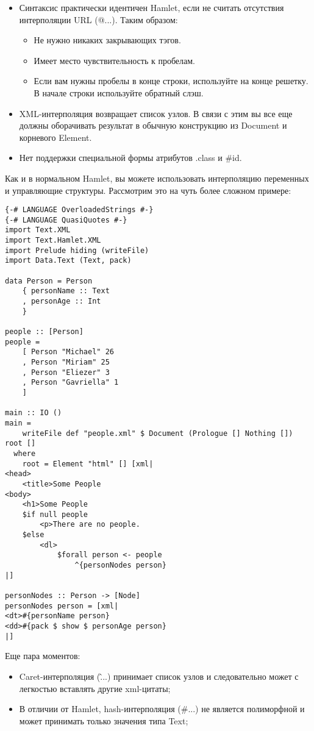 \begin{itemize}
\item Синтаксис практически идентичен Hamlet, если не считать отсутствия интерполяции URL (@{...}). Таким образом:

\begin{itemize}
\item Не нужно никаких закрывающих тэгов.
\item Имеет место чувствительность к пробелам.
\item Если вам нужны пробелы в конце строки, используйте на конце решетку. В начале строки используйте обратный слэш.
\end{itemize}
  
\item XML-интерполяция возвращает список узлов. В связи с этим вы все еще должны оборачивать результат в обычную конструкцию из Document и корневого Element.
\item Нет поддержки специальной формы атрибутов .class и \#id.
\end{itemize}

Как и в нормальном Hamlet, вы можете использовать интерполяцию переменных и управляющие структуры. Рассмотрим это на чуть более сложном примере:

\begin{lstlisting}
{-# LANGUAGE OverloadedStrings #-}
{-# LANGUAGE QuasiQuotes #-}
import Text.XML
import Text.Hamlet.XML
import Prelude hiding (writeFile)
import Data.Text (Text, pack)

data Person = Person
    { personName :: Text
    , personAge :: Int
    }

people :: [Person]
people =
    [ Person "Michael" 26
    , Person "Miriam" 25
    , Person "Eliezer" 3
    , Person "Gavriella" 1
    ]

main :: IO ()
main =
    writeFile def "people.xml" $ Document (Prologue [] Nothing []) root []
  where
    root = Element "html" [] [xml|
<head>
    <title>Some People
<body>
    <h1>Some People
    $if null people
        <p>There are no people.
    $else
        <dl>
            $forall person <- people
                ^{personNodes person}
|]

personNodes :: Person -> [Node]
personNodes person = [xml|
<dt>#{personName person}
<dd>#{pack $ show $ personAge person}
|]
\end{lstlisting}%

Еще пара моментов:

\begin{itemize}
\item Caret-интерполяция (\^{...}) принимает список узлов и следовательно может с легкостью вставлять другие xml-цитаты;
\item В отличии от Hamlet, hash-интерполяция (\#{...}) не является полиморфной и может принимать только значения типа Text;
\end{itemize}

